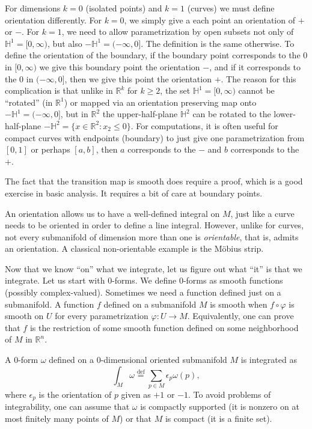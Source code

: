 \documentclass[12pt,openany]{book}
\newcommand{\R}{{\mathbb{R}}}
\newcommand{\bH}{{\mathbb{H}}}
\theoremstyle{plain}
\theoremstyle{remark}
\theoremstyle{definition}
\theoremstyle{exercise}
\theoremstyle{example}
\begin{document}
For dimensions $k=0$ (isolated points) and $k=1$ (curves) we must define
orientation differently.  For $k=0$, we simply give a each point an
orientation of $+$ or $-$.  For $k=1$, we need to allow parametrization by
open subsets not only of $\bH^1 = [0,\infty)$, but also $-\bH^1 = (-\infty,0]$.
The definition is the same otherwise.  To define the orientation
of the boundary, if the boundary point corresponds to the $0$ in
$[0,\infty)$ we give this boundary point the orientation
$-$, and if it corresponds to the $0$ in $(-\infty,0]$, then
we give this point the orientation $+$.  The reason for this complication is
that unlike in $\R^k$ for $k \geq 2$, the set $\bH^1 = [0,\infty)$ cannot be
``rotated'' (in $\R^1$) or mapped via an orientation preserving map onto
$-\bH^1 = (-\infty,0]$, but in $\R^2$ the upper-half-plane $\bH^2$ can
be rotated to the lower-half-plane $-\bH^2 = \{ x \in \R^2 : x_2 \leq 0 \}$.
For computations, it is often useful for compact curves
with endpoints (boundary) to just give one
parametrization from $[0,1]$ or perhaps $[a,b]$, then $a$ corresponds to the
$-$ and $b$ corresponds to the $+$.

The fact that the transition map is smooth does require a proof, which is a
good exercise in basic analysis.  It requires a bit of care at boundary
points.

An orientation allows us to have a well-defined integral on $M$, just
like a curve needs to be oriented in order to define a line integral.
However, unlike for curves, not every submanifold of dimension
more than one is \emph{orientable}, that is, admits an orientation.
A classical non-orientable example is the M\"obius strip.

\medskip

Now that we know ``on'' what we integrate, let us figure out what ``it'' is
that we integrate.  Let us start with $0$-forms.
We define $0$-forms as smooth functions (possibly complex-valued).
Sometimes we need a function defined just on a submanifold.  A function $f$ defined
on a submanifold $M$ is smooth when $f \circ \varphi$ is smooth on $U$
for every parametrization $\varphi \colon U \to M$.  Equivalently,
one can prove that $f$ is the restriction of some smooth function
defined on some neighborhood of $M$ in $\R^n$.

A $0$-form $\omega$ defined on a $0$-dimensional oriented submanifold $M$
is integrated as
\begin{equation*}
\int_M \omega
\overset{\text{def}}{=}
\sum_{p \in M} \epsilon_p \omega(p) ,
\end{equation*}
where $\epsilon_p$ is the orientation of $p$ given as $+1$ or $-1$.
To avoid problems of integrability, 
one can assume that $\omega$ is compactly supported (it is
nonzero on at most finitely many points of $M$) or that $M$ is compact (it
is a finite set).
\end{document}
